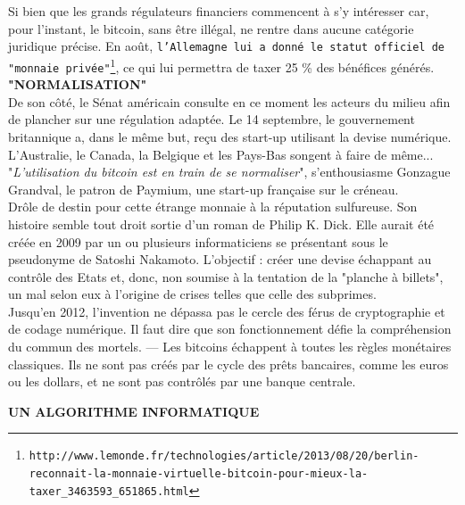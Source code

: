 \documentclass[11pt,twoside,a4paper]{article}
\begin{document}
Si bien que les grands r{\'e}gulateurs financiers commencent {\`a} s'y int{\'e}resser car, pour l'instant, le bitcoin, sans {\^e}tre ill{\'e}gal, ne rentre dans aucune cat{\'e}gorie juridique pr{\'e}cise. En ao{\^u}t, \texttt{l'Allemagne lui a donn{\'e} le statut officiel de "monnaie priv{\'e}e"\footnote{\texttt{http://www.lemonde.fr/technologies/article/2013/08/20/berlin-reconnait-la-monnaie-virtuelle-bitcoin-pour-mieux-la-taxer\_3463593\_651865.html}}}, ce qui lui permettra de taxer 25 \% des b{\'e}n{\'e}fices g{\'e}n{\'e}r{\'e}s. ~\\

\textbf{"NORMALISATION"} ~\\

De son c{\^o}t{\'e}, le S{\'e}nat am{\'e}ricain consulte en ce moment les acteurs du milieu afin de plancher sur une r{\'e}gulation adapt{\'e}e. Le 14 septembre, le gouvernement britannique a, dans le m{\^e}me but, re\c{c}u des start-up utilisant la devise num{\'e}rique. L'Australie, le Canada, la Belgique et les Pays-Bas songent {\`a} faire de m{\^e}me... "\emph{L'utilisation du bitcoin est en train de se normaliser}", s'enthousiasme Gonzague Grandval, le patron de Paymium, une start-up fran\c{c}aise sur le cr{\'e}neau. ~\\

Dr{\^o}le de destin pour cette {\'e}trange monnaie {\`a} la r{\'e}putation sulfureuse. Son histoire semble tout droit sortie d'un roman de Philip K. Dick. Elle aurait {\'e}t{\'e} cr{\'e}{\'e}e en 2009 par un ou plusieurs informaticiens se pr{\'e}sentant sous le pseudonyme de Satoshi Nakamoto. L'objectif : cr{\'e}er une devise {\'e}chappant au contr{\^o}le des Etats et, donc, non soumise {\`a} la tentation de la "planche {\`a} billets", un mal selon eux {\`a} l'origine de crises telles que celle des subprimes. ~\\

Jusqu'en 2012, l'invention ne d{\'e}passa pas le cercle des f{\'e}rus de cryptographie et de codage num{\'e}rique. Il faut dire que son fonctionnement d{\'e}fie la compr{\'e}hension du commun des mortels. --- Les bitcoins {\'e}chappent {\`a} toutes les r{\`e}gles mon{\'e}taires classiques. Ils ne sont pas cr{\'e}{\'e}s par le cycle des pr{\^e}ts bancaires, comme les euros ou les dollars, et ne sont pas contr{\^o}l{\'e}s par une banque centrale. ~\\

\clearpage

\textbf{UN ALGORITHME INFORMATIQUE} ~\\
\end{document}
